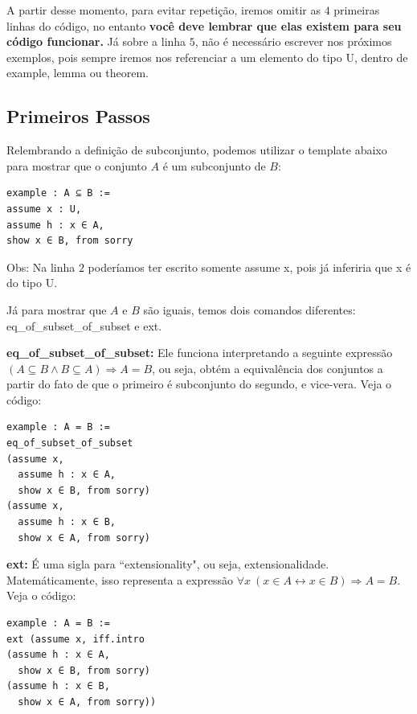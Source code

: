 A partir desse momento, para evitar repetição, iremos omitir as $4$ primeiras linhas do código, no entanto \textbf{você deve lembrar que elas existem para seu código funcionar.} Já sobre a linha $5$, não é necessário escrever nos próximos exemplos, pois sempre iremos nos referenciar a um elemento do tipo{ \selectfont U}, dentro de {\selectfont example, lemma} ou {\selectfont theorem}.

\subsection{Primeiros Passos}

Relembrando a definição de subconjunto, podemos utilizar o template abaixo para mostrar que o conjunto $A$ é um subconjunto de $B$:

\begin{lstlisting}
example : A ⊆ B :=
assume x : U,
assume h : x ∈ A,
show x ∈ B, from sorry \end{lstlisting}

Obs: Na linha $2$ poderíamos ter escrito somente {\selectfont assume x}, pois já inferiria que {\selectfont x} é do tipo {\selectfont U}.

Já para mostrar que $A$ e $B$ são iguais, temos dois comandos diferentes: {\selectfont eq\_of\_subset\_of\_subset} e {\selectfont ext}.

\textbf{eq\_of\_subset\_of\_subset:} Ele funciona interpretando a seguinte expressão $(A \subseteq B \wedge B \subseteq A) \Rightarrow A=B$, ou seja, obtém a equivalência dos conjuntos a partir do fato de que o primeiro é subconjunto do segundo, e vice-vera. Veja o código:

\begin{lstlisting}
example : A = B :=
eq_of_subset_of_subset
(assume x,
  assume h : x ∈ A,
  show x ∈ B, from sorry)
(assume x,
  assume h : x ∈ B,
  show x ∈ A, from sorry) \end{lstlisting}

\textbf{ext:} É uma sigla para ``extensionality", ou seja, extensionalidade. Matemáticamente, isso representa a expressão $\forall x \ (x \in A \leftrightarrow x \in B) \Rightarrow A=B$. Veja o código:

\begin{lstlisting}
example : A = B :=
ext (assume x, iff.intro
(assume h : x ∈ A,
  show x ∈ B, from sorry)
(assume h : x ∈ B,
  show x ∈ A, from sorry)) \end{lstlisting}

